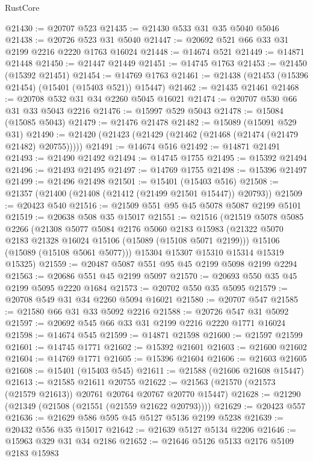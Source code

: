 \begin{lexlean}{RustCore}
\begin{coremodule}
@21430 := @20707 @523
@21435 := @21430 @533 @31 @35 @5040 @5046
@21438 := @20726 @523 @31 @5040
@21447 := @20692 @521 @66 @33 @31 @2199 @2216 @2220 @1763 @16024
@21448 := @14674 @521
@21449 := @14871 @21448
@21450 := @21447 @21449
@21451 := @14745 @1763
@21453 := @21450 (@15392 @21451)
@21454 := @14769 @1763
@21461 := @21438 (@21453 (@15396 @21454) (@15401 (@15403 @521)) @15447)
@21462 := @21435 @21461
@21468 := @20708 @532 @31 @34 @2260 @5045 @16021
@21474 := @20707 @530 @66 @31 @33 @5043 @2216
@21476 := @15997 @529 @5043
@21478 := @15084 (@15085 @5043)
@21479 := @21476 @21478
@21482 := @15089 (@15091 @529 @31)
@21490 := @21420 (@21423 (@21429 (@21462 (@21468 (@21474 (@21479 @21482) @20755)))))
@21491 := @14674 @516
@21492 := @14871 @21491
@21493 := @21490 @21492
@21494 := @14745 @1755
@21495 := @15392 @21494
@21496 := @21493 @21495
@21497 := @14769 @1755
@21498 := @15396 @21497
@21499 := @21496 @21498
@21501 := @15401 (@15403 @516)
@21508 := @21357 (@21400 (@21408 (@21412 (@21499 @21501 @15447)) @20793))
@21509 := @20423 @540
@21516 := @21509 @551 @95 @45 @5078 @5087 @2199 @5101
@21519 := @20638 @508 @35 @15017
@21551 := @21516
    (@21519
      @5078
      @5085
      @2266
      (@21308
        @5077
        @5084
        @2176
        @5060
        @2183
        @15983
        (@21322 @5070 @2183 @21328 @16024 @15106 (@15089 (@15108 @5071 @2199)))
        @15106
        (@15089 (@15108 @5061 @5077)))
      @15304
      @15307
      @15310
      @15314
      @15319
      @15325)
@21559 := @20487 @5087 @551 @95 @45 @2199 @5098 @2199 @2294
@21563 := @20686 @551 @45 @2199 @5097
@21570 := @20693 @550 @35 @45 @2199 @5095 @2220 @1684
@21573 := @20702 @550 @35 @5095
@21579 := @20708 @549 @31 @34 @2260 @5094 @16021
@21580 := @20707 @547
@21585 := @21580 @66 @31 @33 @5092 @2216
@21588 := @20726 @547 @31 @5092
@21597 := @20692 @545 @66 @33 @31 @2199 @2216 @2220 @1771 @16024
@21598 := @14674 @545
@21599 := @14871 @21598
@21600 := @21597 @21599
@21601 := @14745 @1771
@21602 := @15392 @21601
@21603 := @21600 @21602
@21604 := @14769 @1771
@21605 := @15396 @21604
@21606 := @21603 @21605
@21608 := @15401 (@15403 @545)
@21611 := @21588 (@21606 @21608 @15447)
@21613 := @21585 @21611 @20755
@21622 := @21563 (@21570 (@21573 (@21579 @21613)) @20761 @20764 @20767 @20770 @15447)
@21628 := @21290 (@21349 (@21508 (@21551 (@21559 @21622 @20793))))
@21629 := @20423 @557
@21636 := @21629 @586 @595 @45 @5127 @5136 @2199 @5238
@21639 := @20432 @556 @35 @15017
@21642 := @21639 @5127 @5134 @2206
@21646 := @15963 @329 @31 @34 @2186
@21652 := @21646 @5126 @5133 @2176 @5109 @2183 @15983

\end{coremodule}
\end{lexlean}
